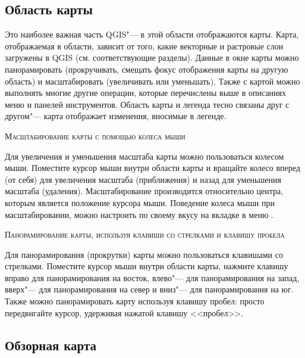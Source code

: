 \subsection{Область карты}\label{label_mapview}

Это наиболее важная часть QGIS"--- в этой области отображаются карты. Карта,
отображаемая в области, зависит от того, какие векторные и растровые
слои загружены в QGIS (см. соответствующие разделы). Данные в окне карты
можно панорамировать (прокручивать, смещать фокус отображения карты на
другую область) и масштабировать (увеличивать или уменьшать). Также с
картой можно выполнять многие другие операции, которые перечислены выше
в описаниях меню и панелей инструментов. Область карты и легенда тесно
связаны друг с другом"--- карта отображает изменения, вносимые в легенде.

\begin{Tip}\caption{\textsc{Масштабирование карты с помощью колеса мыши}}
Для увеличения и уменьшения масштаба карты можно пользоваться колесом мыши.
Поместите курсор мыши внутри области карты и вращайте колесо вперед (от себя)
для увеличения масштаба (приближения) и назад для уменьшения масштаба
(удаления). Масштабирование производится относительно центра, которым
является положение курсора мыши. Поведение колеса мыши при масштабировании,
можно настроить по своему вкусу на вкладке  в
меню  \arrow {}.
\end{Tip}

\begin{Tip}\caption{\textsc{Панорамирование карты, используя клавиши
со стрелками и клавишу пробела}}
Для панорамирования (прокрутки) карты можно пользоваться клавишами со стрелками.
Поместите курсор мыши внутри области карты, нажмите клавишу вправо
для панорамирования на восток, влево"--- для панорамирования
на запад, вверх"--- для панорамирования на север и вниз"--- для
панорамирования на юг. Также можно панорамировать карту используя клавишу
пробел: просто передвигайте курсор, удерживая нажатой клавишу <<пробел>>.
\end{Tip}

\subsection{Обзорная карта}\label{label_mapoverview}

